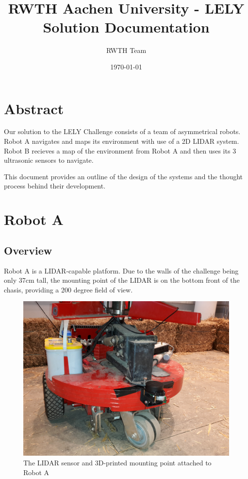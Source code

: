 \documentclass[11pt]{article}
\title{RWTH Aachen University - LELY Solution Documentation}
\author{RWTH Team}
\date{\today}
\begin{document}
	\maketitle	
	
	\section{Abstract}
	
	Our solution to the LELY Challenge consists of a team of asymmetrical robots. Robot A navigates and maps its environment with use of a 2D LIDAR system. Robot B recieves a map of the environment from Robot A and then uses its 3 ultrasonic sensors to navigate. \newline
	
	This document provides an outline of the design of the systems and the thought process behind their development.	
	
	\section{Robot A}
	
	\subsection{Overview}
	Robot A is a LIDAR-capable platform. Due to the walls of the challenge being only 37cm tall, the mounting point of the LIDAR is on the bottom front of the chasis, providing a 200 degree field of view. 
	
	\begin{figure}[h]
		\centering
		\includegraphics[scale=0.1]{robot_a}
		\caption{The LIDAR sensor and 3D-printed mounting point attached to Robot A}
	\end{figure}
	
\end{document}
